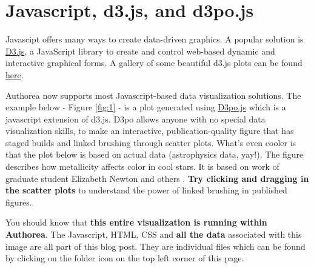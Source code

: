 \section{Javascript, d3.js, and d3po.js}

Javascipt offers many ways to create data-driven graphics. A popular solution is \href{http://d3js.org/}{D3.js}, a JavaScript library to create and control web-based dynamic and interactive graphical forms. A gallery of some beautiful d3.js plots can be found \href{https://github.com/mbostock/d3/wiki/Gallery}{here}.

Authorea now supports most Javascript-based data visualization solutions. The example below - Figure \ref{fig:1} - is a plot generated using \href{http://d3po.org/}{D3po.js} which is a javascript extension of d3.js. D3po allows anyone with no special data visualization skills, to make an interactive, publication-quality figure that has staged builds and linked brushing through scatter plots. What's even cooler is that the plot below is based on actual data (astrophysics data, yay!). The figure describes how metallicity affects color in cool stars. It is based on work of graduate student Elizabeth Newton and others \cite{2014AJ....147...20N}. \textbf{Try clicking and dragging in the scatter plots} to understand the power of linked brushing in published figures.

You should know that \textbf{this entire visualization is running within Authorea}. The Javascript, HTML, CSS and \textbf{all the data} associated with this image are all part of this blog post. They are individual files which can be found by clicking on the folder icon on the top left corner of this page.

 